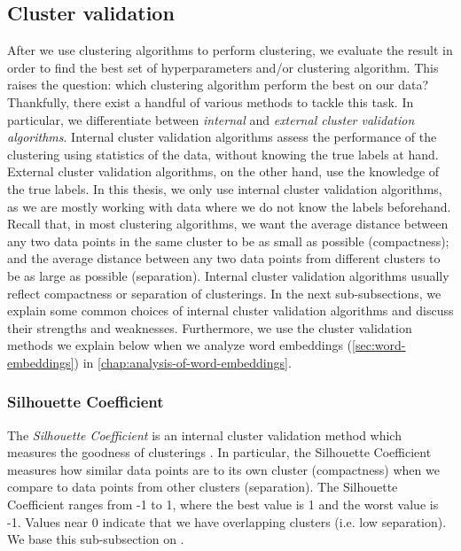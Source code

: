 \subsection{Cluster validation}
\label{sec:cluster-validation}
After we use clustering algorithms to perform clustering, we evaluate the result in order to find the best set of hyperparameters and/or clustering algorithm. This raises the question: which clustering algorithm perform the best on our data? Thankfully, there exist a handful of various methods to tackle this task. In particular, we differentiate between \textit{internal} and \textit{external cluster validation algorithms}. Internal cluster validation algorithms assess the performance of the clustering using statistics of the data, without knowing the true labels at hand. External cluster validation algorithms, on the other hand, use the knowledge of the true labels. In this thesis, we only use internal cluster validation algorithms, as we are mostly working with data where we do not know the labels beforehand. Recall that, in most clustering algorithms, we want the average distance between any two data points in the same cluster to be as small as possible (compactness); and the average distance between any two data points from different clusters to be as large as possible (separation). Internal cluster validation algorithms usually reflect compactness or separation of clusterings. In the next sub-subsections, we explain some common choices of internal cluster validation algorithms and discuss their strengths and weaknesses. Furthermore, we use the cluster validation methods we explain below when we analyze word embeddings (\cref{sec:word-embeddings}) in \cref{chap:analysis-of-word-embeddings}.

\subsubsection{Silhouette Coefficient}
\label{sec:silhouette-coefficient}
The \textit{Silhouette Coefficient} is an internal cluster validation method which measures the goodness of clusterings \cite[p. 87]{Kaufman1990}. In particular, the Silhouette Coefficient measures how similar data points are to its own cluster (compactness) when we compare to data points from other clusters (separation). The Silhouette Coefficient ranges from -1 to 1, where the best value is 1 and the worst value is -1. Values near 0 indicate that we have overlapping clusters (i.e. low separation). We base this sub-subsection on \cite[p. 87]{Kaufman1990}.

